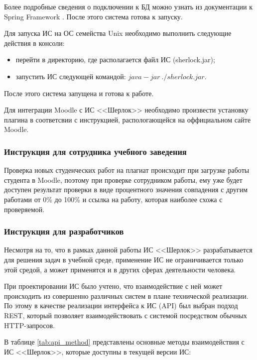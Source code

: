 			Более подробные сведения о подключении к БД можно узнать из документации к Spring Framework \cite{web:mongodb_manual}. После этого система готова к запуску.

			Для запуска ИС на ОС семейства Unix необходимо выполнить следующие действия в консоли:
			\begin{itemize}
				\item перейти в директорию, где располагается файл ИС (sherlock.jar);
				\item запустить ИС следующей командой: $java -jar\ ./sherlock.jar$.
			\end{itemize}

			После этого система запущена и готова к работе.

			Для интеграции Moodle с ИС <<Шерлок>> необходимо произвести установку плагина в соответсвии с инструкцией, распологающейся на оффициальном сайте Moodle.

		\subsubsection{Инструкция для сотрудника учебного заведения}

			Проверка новых студенческих работ на плагиат происходит при загрузке работы студента в Moodle, поэтому при проверке сотрудником работы, ему уже будет доступен результат проверки в виде процентного значения совпадения с другим работами от 0\% до 100\% и ссылка на работу, которая наиболее схожа с проверяемой.

		\subsubsection{Инструкция для разработчиков}

			Несмотря на то, что в рамках данной работы ИС <<Шерлок>> разрабатывается для решения задач в учебной среде, применение ИС не ограничивается только этой средой, а может применятся и в других сферах деятельности человека.

			При проектировании ИС было учтено, что взаимодействие с ней может происходить из совершенно различных систем в плане технической реализации. По этому в качестве реализации интерфейса к ИС (API) был выбран подход REST, который позволяет взаимодействовать с системой посредством обычных HTTP-запросов.

			В таблице \ref{tab:api_method} представлены основные методы взаимодействия с ИС <<Шерлок>>, которые доступны в текущей версии ИС:

